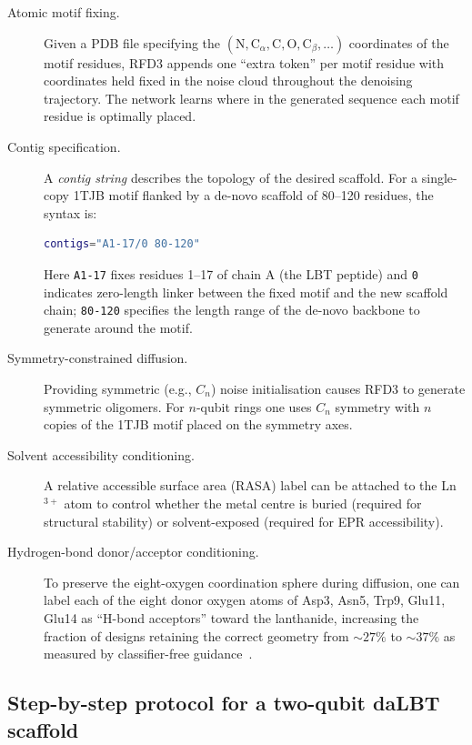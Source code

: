 \documentclass[11pt,oneside]{amsbook}
\numberwithin{equation}{section}
\theoremstyle{plain}
\theoremstyle{definition}
\theoremstyle{remark}
\begin{document}
\begin{description}
\item[Atomic motif fixing.]  Given a PDB file specifying the $(\text{N},
  \text{C}_\alpha, \text{C}, \text{O}, \text{C}_\beta, \ldots)$ coordinates of
  the motif residues, RFD3 appends one ``extra token'' per motif residue with
  coordinates held fixed in the noise cloud throughout the denoising trajectory.
  The network learns where in the generated sequence each motif residue is
  optimally placed.

\item[Contig specification.]  A \emph{contig string} describes the topology of
  the desired scaffold.  For a single-copy 1TJB motif flanked by a de-novo
  scaffold of 80--120 residues, the syntax is:
  \begin{lstlisting}[language=bash,basicstyle=\small\ttfamily]
  contigs="A1-17/0 80-120"
  \end{lstlisting}
  Here \texttt{A1-17} fixes residues 1--17 of chain A (the LBT peptide) and
  \texttt{0} indicates zero-length linker between the fixed motif and the
  new scaffold chain; \texttt{80-120} specifies the length range of the de-novo
  backbone to generate around the motif.

\item[Symmetry-constrained diffusion.]  Providing symmetric (e.g., $C_n$) noise
  initialisation causes RFD3 to generate symmetric oligomers.  For $n$-qubit
  rings one uses $C_n$ symmetry with $n$ copies of the 1TJB motif placed on the
  symmetry axes.

\item[Solvent accessibility conditioning.]  A relative accessible surface area
  (RASA) label can be attached to the Ln$^{3+}$ atom to control whether the
  metal centre is buried (required for structural stability) or solvent-exposed
  (required for EPR accessibility).

\item[Hydrogen-bond donor/acceptor conditioning.]  To preserve the
  eight-oxygen coordination sphere during diffusion, one can label each of the
  eight donor oxygen atoms of Asp3, Asn5, Trp9, Glu11, Glu14 as
  ``H-bond acceptors'' toward the lanthanide, increasing the fraction of designs
  retaining the correct geometry from $\sim 27\%$ to $\sim 37\%$ as measured by
  classifier-free guidance~\cite{ButcherEtAl2025}.
\end{description}

\subsection{Step-by-step protocol for a two-qubit daLBT scaffold}
\label{subsec:pqpu_protocol_2q}
\end{document}

